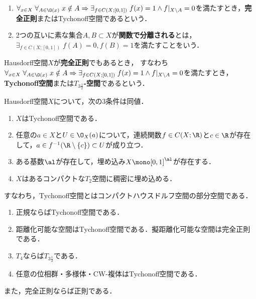 \documentclass[uplatex,dvipdfmx]{jsreport}
\begin{document}
\begin{definition}\mbox{}
    \begin{enumerate}
        \item $\forall_{x\in X}\;\forall_{A\in\O(x)}\;x\notin A\Rightarrow\exists_{f\in C(X;[0,1])}\;f(x)=1\land f|_{X\setminus A}=0$を満たすとき，\textbf{完全正則}またはTychonoff空間であるという．
        \item 2つの互いに素な集合$A,B\subset X$が\textbf{関数で分離される}とは，$\exists_{f\in C(X;[0,1])}\;f(A)=0,f(B)=1$を満たすことをいう．
    \end{enumerate}
    Hausdorff空間$X$が\textbf{完全正則}でもあるとき，
    すなわち$\forall_{x\in X}\;\forall_{A\in\O(x)}\;x\notin A\Rightarrow\exists_{f\in C(X;[0,1])}\;f(x)=1\land f|_{X\setminus A}=0$を満たすとき，\textbf{Tychonoff空間}または\textbf{$T_{3\frac{1}{2}}$-空間}であるという．
\end{definition}

\begin{proposition}[Tychonoff空間の特徴付け]
    Hausdorff空間$X$について，次の3条件は同値．
    \begin{enumerate}
        \item $X$はTychonoff空間である．
        \item 任意の$a\in X$と$U\in\O_X(a)$について，連続関数$f\in C(X;\R)$と$c\in\R$が存在して，$a\in f^{-1}(\R\setminus\{c\})\subset U$が成り立つ．
        \item ある基数$\al$が存在して，埋め込み$X\mono[0,1]^\al$が存在する．
        \item $X$はあるコンパクトな$T_2$空間に稠密に埋め込める．
    \end{enumerate}
    すなわち，Tychonoff空間とはコンパクトハウスドルフ空間の部分空間である．
\end{proposition}

\begin{proposition}[Tychonoff空間の十分条件]\mbox{}
    \begin{enumerate}
        \item 正規ならばTychonoff空間である．
        \item 距離化可能な空間はTychonoff空間である．擬距離化可能な空間は完全正則である．
        \item $T_4$ならば$T_{3\frac{1}{2}}$である．
        \item 任意の位相群・多様体・CW-複体はTychonoff空間である．
    \end{enumerate}
    また，完全正則ならば正則である．
\end{proposition}
\end{document}
